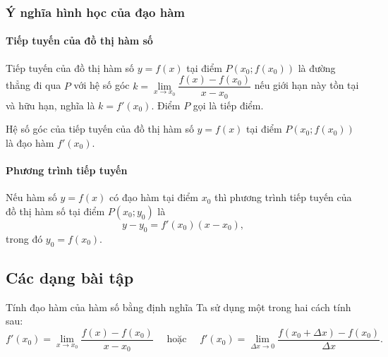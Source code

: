 \begin{tomtat}
	\subsubsection{Ý nghĩa hình học của đạo hàm}
	\paragraph{Tiếp tuyến của đồ thị hàm số}
	\begin{dn}
	Tiếp tuyến của đồ thị hàm số $y=f(x)$ tại điểm $P(x_0;f(x_0))$ là đường thẳng đi qua $P$ với hệ số góc $k=\lim\limits_{x \to x_0} \dfrac{f(x)-f(x_0)}{x-x_0}$ nếu giới hạn này tồn tại và hữu hạn, nghĩa là $k=f'(x_0)$. Điểm $P$ gọi là tiếp điểm.
	\end{dn}
	\begin{nx}
	Hệ số góc của tiếp tuyến của đồ thị hàm số $y=f(x)$ tại điểm $P(x_0;f(x_0))$ là đạo hàm $f'(x_0)$.
	\end{nx}
	\paragraph{Phương trình tiếp tuyến}
	\begin{dn}
	Nếu hàm số $y=f(x)$ có đạo hàm tại điểm $x_0$ thì phương trình tiếp tuyến của đồ thị hàm số tại điểm $P(x_0;y_0)$ là 
	$$y-y_0=f'(x_0)(x-x_0),$$
	trong đó $y_0=f(x_0)$.
	\end{dn}	
\end{tomtat}
\subsection{Các dạng bài tập}
\begin{dang}{Tính đạo hàm của hàm số bằng định nghĩa}
	Ta sử dụng một trong hai cách tính sau:
	\[f'(x_0)=\lim\limits_{x \to x_0} \dfrac{f(x)-f(x_0)}{x-x_0}\quad \text{ hoặc }\quad f'(x_0)=\lim\limits_{\Delta x \to 0} \dfrac{f(x_0+\Delta x)-f(x_0)}{\Delta x}.\]
\end{dang}
